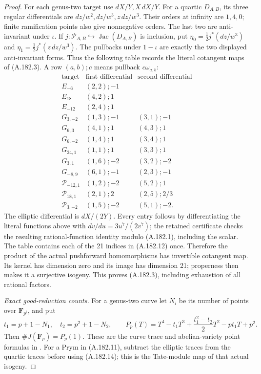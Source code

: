 \begin{proof}
For each genus-two target use \(dX/Y,X\,dX/Y\).  For a quartic
\(D_{A,B}\), its three regular differentials are
\(dz/w^2,dz/w^3,z\,dz/w^3\).  Their orders at infinity are
\(1,4,0\); finite ramification points also give nonnegative
orders.  The last two are anti-invariant under \(\iota\).
If \(j:\mathcal P_{A,B}\hookrightarrow\operatorname{Jac}(D_{A,B})\)
is inclusion, put \(\eta_0=\tfrac12j^*(dz/w^3)\) and
\(\eta_1=\tfrac12j^*(z\,dz/w^3)\).  The pullbacks under
\(1-\iota\) are exactly the two displayed anti-invariant forms.
Thus the following table records the literal cotangent maps of
(A.182.3).  A row \((a,b);c\) means pullback
\(c\omega_{a,b}\):
\[
\begin{array}{c|c|c}
\text{target}&\text{first differential}&\text{second differential}\\ \hline
E_{-6}&(2,2);-1&\\
E_{18}&(4,2);1&\\
E_{-12}&(2,4);1&\\ \hline
G_{3,-2}&(1,3);-1&(3,1);-1\\
G_{6,3}&(4,1);1&(4,3);1\\
G_{6,-2}&(1,4);1&(3,4);1\\
G_{24,1}&(1,1);1&(3,3);1\\
G_{3,1}&(1,6);-2&(3,2);-2\\
G_{-8,9}&(6,1);-1&(2,3);-1\\ \hline
\mathcal P_{-12,1}&(1,2);-2&(5,2);1\\
\mathcal P_{18,1}&(2,1);2&(2,5);2/3\\
\mathcal P_{3,-2}&(1,5);-2&(5,1);-2.
\end{array}
\tag{A.182.13}
\]
The elliptic differential is \(dX/(2Y)\).  Every entry follows
by differentiating the literal functions above with
\(dv/du=3u^7/(2v^7)\); the retained certificate checks the
resulting rational-function identity modulo (A.182.1), including
the scalar.  The table contains each of the 21 indices in
(A.182.12) once.  Therefore the product of the actual
pushforward homomorphisms has invertible cotangent map.
Its kernel has dimension zero and its image has dimension 21;
properness then makes it a surjective isogeny.  This proves
(A.182.3), including exhaustion of all rational factors.

\emph{Exact good-reduction counts.}
For a genus-two curve let \(N_i\) be its number of points over
\(\mathbf F_{p^i}\), and put
\[
 t_1=p+1-N_1,\quad t_2=p^2+1-N_2,\qquad
 P_p(T)=T^4-t_1T^3+\frac{t_1^2-t_2}{2}T^2-pt_1T+p^2.
\tag{A.182.14}
\]
Then \(\#J(\mathbf F_p)=P_p(1)\).  These are the curve trace
and abelian-variety point formulas in
\cite[III, Theorem 11.1; II, Theorem 1.1]{LegMilneAV2008}.
For a Prym in (A.182.11), subtract the elliptic traces from the
quartic traces before using (A.182.14); this is the Tate-module
map of that actual isogeny.


\end{proof}
